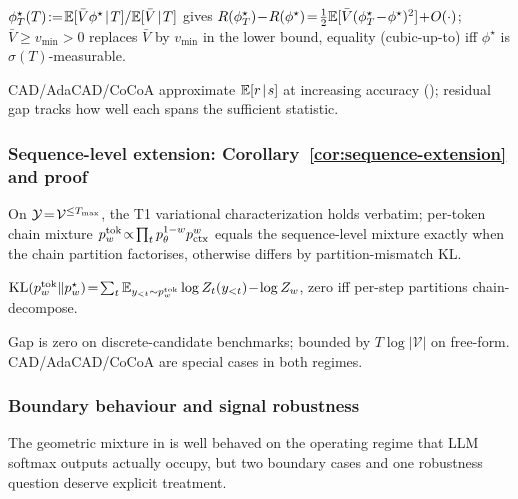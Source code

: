 \begin{corollary}
\label{cor:t1-coarsening}
$\phi_T^\star(T)\!:=\!\mathbb{E}[\bar V\phi^\star\!\mid\!T]/\mathbb{E}[\bar V\!\mid\!T]$
gives $R(\phi_T^\star)\!-\!R(\phi^\star)\!=\!\tfrac12\E[\bar V(\phi_T^\star\!-\!\phi^\star)^2]\!+\!O(\cdot)$;
$\bar V\!\ge\!v_{\min}\!>\!0$ replaces $\bar V$ by $v_{\min}$ in
the lower bound, equality (cubic-up-to) iff $\phi^\star$ is
$\sigma(T)$-measurable.
\end{corollary}

CAD/AdaCAD/CoCoA approximate $\mathbb{E}[r\!\mid\!s]$ at increasing
accuracy (); residual gap tracks
how well each spans the sufficient statistic.

\subsubsection{Sequence-level extension: Corollary~\ref{cor:sequence-extension} and proof}
\label{app:t1-sequence-extension}

\begin{corollary}
\label{cor:sequence-extension}
On $\mathcal{Y}\!=\!\mathcal{V}^{\le T_{\max}}$, the T1 variational
characterization holds verbatim; per-token chain mixture
$p_w^{\mathrm{tok}}\!\propto\!\prod_t p_\theta^{1-w}p_{\mathrm{ctx}}^w$ equals
the sequence-level mixture exactly when the chain partition
factorises, otherwise differs by partition-mismatch KL.
\end{corollary}

\begin{lemma}
\label{lem:chain-mixture-gap}
$\operatorname{KL}(p_w^{\mathrm{tok}}\|p_w^\star)\!=\!\sum_t\mathbb{E}_{y_{<t}\sim p_w^{\mathrm{tok}}}\log Z_t(y_{<t})\!-\!\log Z_w$,
zero iff per-step partitions chain-decompose.
\end{lemma}

Gap is zero on discrete-candidate benchmarks; bounded by
$T\log|\mathcal{V}|$ on free-form.  CAD/AdaCAD/CoCoA are special
cases in both regimes.

\subsubsection{Boundary behaviour and signal robustness}
\label{app:thm1-boundary}

The geometric mixture in  is well behaved
on the operating regime that LLM softmax outputs actually occupy, but
two boundary cases and one robustness question deserve explicit
treatment.

